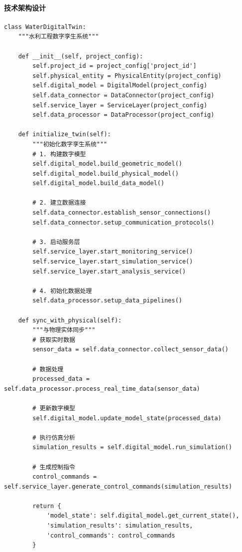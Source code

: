 \hypertarget{ux6280ux672fux67b6ux6784ux8bbeux8ba1}{%
\paragraph{技术架构设计}\label{ux6280ux672fux67b6ux6784ux8bbeux8ba1}}

\begin{lstlisting}[style=python]
class WaterDigitalTwin:
    """水利工程数字孪生系统"""
    
    def __init__(self, project_config):
        self.project_id = project_config['project_id']
        self.physical_entity = PhysicalEntity(project_config)
        self.digital_model = DigitalModel(project_config)
        self.data_connector = DataConnector(project_config)
        self.service_layer = ServiceLayer(project_config)
        self.data_processor = DataProcessor(project_config)
        
    def initialize_twin(self):
        """初始化数字孪生系统"""
        # 1. 构建数字模型
        self.digital_model.build_geometric_model()
        self.digital_model.build_physical_model()
        self.digital_model.build_data_model()
        
        # 2. 建立数据连接
        self.data_connector.establish_sensor_connections()
        self.data_connector.setup_communication_protocols()
        
        # 3. 启动服务层
        self.service_layer.start_monitoring_service()
        self.service_layer.start_simulation_service()
        self.service_layer.start_analysis_service()
        
        # 4. 初始化数据处理
        self.data_processor.setup_data_pipelines()
        
    def sync_with_physical(self):
        """与物理实体同步"""
        # 获取实时数据
        sensor_data = self.data_connector.collect_sensor_data()
        
        # 数据处理
        processed_data = self.data_processor.process_real_time_data(sensor_data)
        
        # 更新数字模型
        self.digital_model.update_model_state(processed_data)
        
        # 执行仿真分析
        simulation_results = self.digital_model.run_simulation()
        
        # 生成控制指令
        control_commands = self.service_layer.generate_control_commands(simulation_results)
        
        return {
            'model_state': self.digital_model.get_current_state(),
            'simulation_results': simulation_results,
            'control_commands': control_commands
        }
        

\end{lstlisting}
